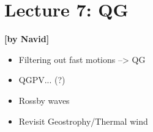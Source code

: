 
\section{Lecture 7: QG}\label{sec:lecture7}
\begin{flushright}\textbf{[by Navid]}\end{flushright}
  
 \begin{itemize}
   \item
   Filtering out fast motions --> QG
   \item
   QGPV... (?)
   \item
   Rossby waves
   \item
   Revisit Geostrophy/Thermal wind
 \end{itemize}

